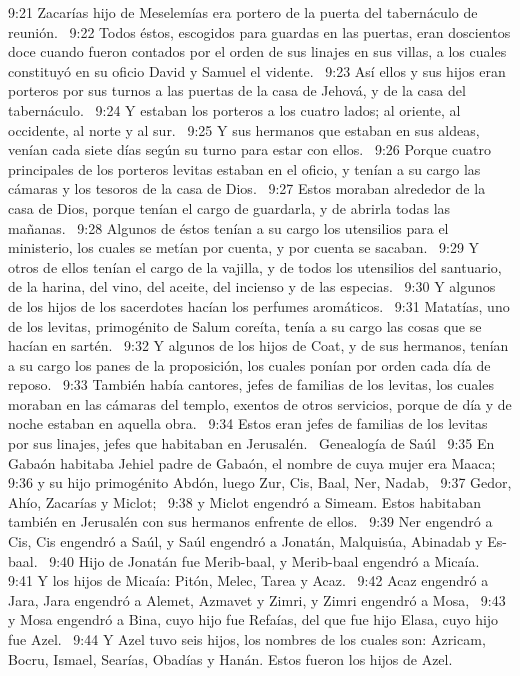 9:21 Zacarías hijo de Meselemías era portero de la puerta del tabernáculo de reunión.  
9:22 Todos éstos, escogidos para guardas en las puertas, eran doscientos doce cuando fueron contados por el orden de sus linajes en sus villas, a los cuales constituyó en su oficio David y Samuel el vidente.  
9:23 Así ellos y sus hijos eran porteros por sus turnos a las puertas de la casa de Jehová, y de la casa del tabernáculo.  
9:24 Y estaban los porteros a los cuatro lados; al oriente, al occidente, al norte y al sur.  
9:25 Y sus hermanos que estaban en sus aldeas, venían cada siete días según su turno para estar con ellos.  
9:26 Porque cuatro principales de los porteros levitas estaban en el oficio, y tenían a su cargo las cámaras y los tesoros de la casa de Dios.  
9:27 Estos moraban alrededor de la casa de Dios, porque tenían el cargo de guardarla, y de abrirla todas las mañanas.  
9:28 Algunos de éstos tenían a su cargo los utensilios para el ministerio, los cuales se metían por cuenta, y por cuenta se sacaban.  
9:29 Y otros de ellos tenían el cargo de la vajilla, y de todos los utensilios del santuario, de la harina, del vino, del aceite, del incienso y de las especias.  
9:30 Y algunos de los hijos de los sacerdotes hacían los perfumes aromáticos.  
9:31 Matatías, uno de los levitas, primogénito de Salum coreíta, tenía a su cargo las cosas que se hacían en sartén.  
9:32 Y algunos de los hijos de Coat, y de sus hermanos, tenían a su cargo los panes de la proposición, los cuales ponían por orden cada día de reposo.  
9:33 También había cantores, jefes de familias de los levitas, los cuales moraban en las cámaras del templo, exentos de otros servicios, porque de día y de noche estaban en aquella obra.  
9:34 Estos eran jefes de familias de los levitas por sus linajes, jefes que habitaban en Jerusalén.  
Genealogía de Saúl  
9:35 En Gabaón habitaba Jehiel padre de Gabaón, el nombre de cuya mujer era Maaca;  
9:36 y su hijo primogénito Abdón, luego Zur, Cis, Baal, Ner, Nadab,  
9:37 Gedor, Ahío, Zacarías y Miclot;  
9:38 y Miclot engendró a Simeam. Estos habitaban también en Jerusalén con sus hermanos enfrente de ellos.  
9:39 Ner engendró a Cis, Cis engendró a Saúl, y Saúl engendró a Jonatán, Malquisúa, Abinadab y Es-baal.  
9:40 Hijo de Jonatán fue Merib-baal, y Merib-baal engendró a Micaía.  
9:41 Y los hijos de Micaía: Pitón, Melec, Tarea y Acaz.  
9:42 Acaz engendró a Jara, Jara engendró a Alemet, Azmavet y Zimri, y Zimri engendró a Mosa,  
9:43 y Mosa engendró a Bina, cuyo hijo fue Refaías, del que fue hijo Elasa, cuyo hijo fue Azel.  
9:44 Y Azel tuvo seis hijos, los nombres de los cuales son: Azricam, Bocru, Ismael, Searías, Obadías y Hanán. Estos fueron los hijos de Azel.  
